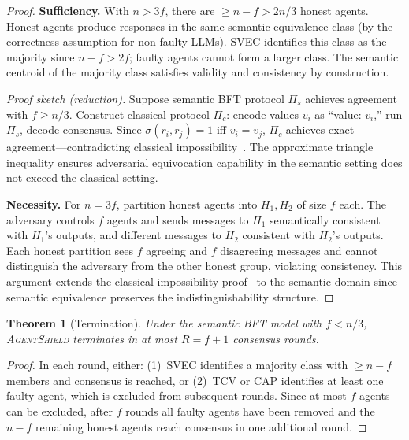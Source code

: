\documentclass[journal,10pt]{IEEEtran}
\newtheorem{theorem}{Theorem}
\begin{document}
\begin{proof}
\textbf{Sufficiency.} With $n > 3f$, there are $\geq n - f > 2n/3$ honest agents. Honest agents produce responses in the same semantic equivalence class (by the correctness assumption for non-faulty LLMs). SVEC identifies this class as the majority since $n - f > 2f$; faulty agents cannot form a larger class. The semantic centroid of the majority class satisfies validity and consistency by construction.

\emph{Proof sketch (reduction).} Suppose semantic BFT protocol $\Pi_s$ achieves agreement with $f \geq n/3$. Construct classical protocol $\Pi_c$: encode values $v_i$ as ``value: $v_i$,'' run $\Pi_s$, decode consensus. Since $\sigma(r_i, r_j) = 1$ iff $v_i = v_j$, $\Pi_c$ achieves exact agreement---contradicting classical impossibility~\cite{r15}. The approximate triangle inequality ensures adversarial equivocation capability in the semantic setting does not exceed the classical setting.



\textbf{Necessity.} For $n = 3f$, partition honest agents into $H_1, H_2$ of size $f$ each. The adversary controls $f$ agents and sends messages to $H_1$ semantically consistent with $H_1$'s outputs, and different messages to $H_2$ consistent with $H_2$'s outputs. Each honest partition sees $f$ agreeing and $f$ disagreeing messages and cannot distinguish the adversary from the other honest group, violating consistency. This argument extends the classical impossibility proof~\cite{lamport1982byzantine} to the semantic domain since semantic equivalence preserves the indistinguishability structure.
\end{proof}

\begin{theorem}[Termination]\label{thm:termination}
Under the semantic BFT model with $f < n/3$, \textsc{AgentShield} terminates in at most $R = f + 1$ consensus rounds.
\end{theorem}

\begin{proof}
In each round, either: (1)~SVEC identifies a majority class with $\geq n - f$ members and consensus is reached, or (2)~TCV or CAP identifies at least one faulty agent, which is excluded from subsequent rounds. Since at most $f$ agents can be excluded, after $f$ rounds all faulty agents have been removed and the $n - f$ remaining honest agents reach consensus in one additional round.
\end{proof}
\end{document}

